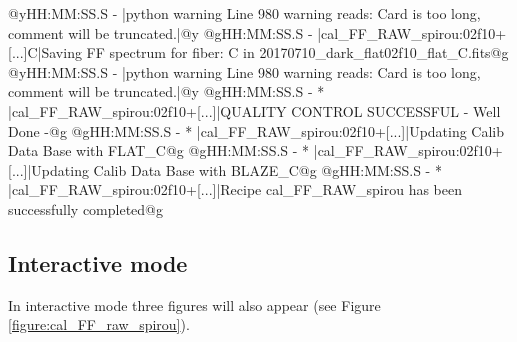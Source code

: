 \begin{cmdboxprintspecial}[fontupper=\tiny, fontlower=\tiny]
@yHH:MM:SS.S - \@ |python warning Line 980  warning reads: Card is too long, comment will be truncated.|@y
@gHH:MM:SS.S -   |cal_FF_RAW_spirou:02f10+[...]C|Saving FF spectrum for fiber: C in 20170710_dark_flat02f10_flat_C.fits@g
@yHH:MM:SS.S - \@ |python warning Line 980  warning reads: Card is too long, comment will be truncated.|@y
@gHH:MM:SS.S - * |cal_FF_RAW_spirou:02f10+[...]|QUALITY CONTROL SUCCESSFUL - Well Done -@g
@gHH:MM:SS.S - * |cal_FF_RAW_spirou:02f10+[...]|Updating Calib Data Base with FLAT_C@g
@gHH:MM:SS.S - * |cal_FF_RAW_spirou:02f10+[...]|Updating Calib Data Base with BLAZE_C@g
@gHH:MM:SS.S - * |cal_FF_RAW_spirou:02f10+[...]|Recipe cal_FF_RAW_spirou has been successfully completed@g

\end{cmdboxprintspecial}


\newpage
\subsection{Interactive mode}

\noindent In interactive mode three figures will also appear (see Figure \ref{figure:cal_FF_raw_spirou}).

